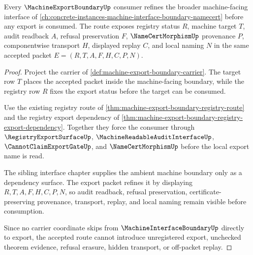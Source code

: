 \begin{theorem}
\label{thm:machine-export-boundary-machine-interface-dependency}
Every $\MachineExportBoundaryUp$ consumer refines the broader machine-facing interface of \autoref{ch:concrete-instances-machine-interface-boundary-namecert} before any export is consumed. The route exposes registry status $R$, machine target $T$, audit readback $A$, refusal preservation $F$, $\NameCertMorphismUp$ provenance $P$, componentwise transport $H$, displayed replay $C$, and local naming $N$ in the same accepted packet $E=(R,T,A,F,H,C,P,N)$.
\end{theorem}
\begin{proof}
Project the carrier of \autoref{def:machine-export-boundary-carrier}. The target row $T$ places the accepted packet inside the machine-facing boundary, while the registry row $R$ fixes the export status before the target can be consumed.

Use the existing registry route of \autoref{thm:machine-export-boundary-registry-route} and the registry export dependency of \autoref{thm:machine-export-boundary-registry-export-dependency}. Together they force the consumer through $\RegistryExportSurfaceUp$, $\MachineReadableAuditInterfaceUp$, $\CannotClaimExportGateUp$, and $\NameCertMorphismUp$ before the local export name is read.

The sibling interface chapter supplies the ambient machine boundary only as a dependency surface. The export packet refines it by displaying $R,T,A,F,H,C,P,N$, so audit readback, refusal preservation, certificate-preserving provenance, transport, replay, and local naming remain visible before consumption.

Since no carrier coordinate skips from $\MachineInterfaceBoundaryUp$ directly to export, the accepted route cannot introduce unregistered export, unchecked theorem evidence, refusal erasure, hidden transport, or off-packet replay.
\end{proof}
